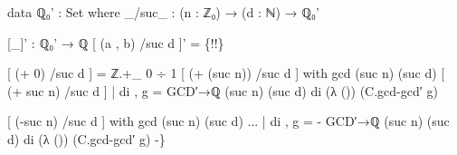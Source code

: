 \begin{code}
{data ℚ₀' : Set where
  \_/suc\_ : (n : ℤ₀) → (d : ℕ) → ℚ₀'


[\_]' : ℚ₀' → ℚ
[ (a , b) /suc d ]' = \{!!\}

[ (+ 0) /suc d ] = ℤ.+\_ 0 ÷ 1
[ (+ (suc n)) /suc d ] with gcd (suc n) (suc d)
[ (+ suc n) /suc d ] | di , g = GCD′→ℚ (suc n) (suc d) di (λ ()) (C.gcd-gcd′ g)

[ (-suc n) /suc d ] with gcd (suc n) (suc d)
... | di , g = - GCD′→ℚ (suc n) (suc d) di (λ ()) (C.gcd-gcd′ g)
-\}}\<%
\\
%
\\
\>\<\end{code}